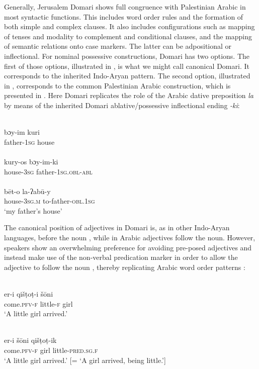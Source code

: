 \documentclass[output=paper]{langsci/langscibook}
\begin{document}
Generally, Jerusalem Domari shows full congruence with Palestinian Arabic in most syntactic functions. This includes word order rules and the formation of both simple and complex clauses. It also includes configurations such as mapping of tenses and modality to complement and conditional clauses, and the mapping of semantic relations onto case markers. The latter can be adpositional or inflectional. For nominal possessive constructions, Domari has two options. The first of those options, illustrated in , is what we might call canonical Domari. It corresponds to the inherited Indo-Aryan pattern. The second option, illustrated in , corresponds to the common Palestinian Arabic construction, which is presented in . Here Domari replicates the role of the Arabic dative preposition \textit{la} by means of the inherited Domari ablative/possessive inflectional ending \textit{-ki}:

\ea\label{ex:matras:}
\ea
{}\\
\gll bɔy-im kuri    \\
     father-\textsc{1sg} house\\ \label{kuri}
\ex
{}\\
\gll kury-os bɔy-im-ki  \\
       house-\textsc{3sg} father-\textsc{1sg.obl-abl}\\ \label{boy}
\ex
{}\\
\gll bēt-o la-ʔabū-y  \\
       house-\textsc{3sg.m} to-father-\textsc{obl.1sg}\\
\glt   ‘my father’s house’ \label{bett}
\z
\z

The canonical position of adjectives in Domari is, as in other Indo-Aryan languages, before the noun , while in Arabic adjectives follow the noun. However, speakers show an overwhelming preference for avoiding pre-posed adjectives and instead make use of the non-verbal predication marker in order to allow the adjective to follow the noun , thereby replicating Arabic word order patterns :

\ea\label{girls}
\ea
{}\\
\gll er-i qišṭoṭ-i šōni  \\
       come.\textsc{pfv-f} little-\textsc{f} girl\\
\glt   ‘A little girl arrived.’ \label{girla}

\ex\label{ex:matras:}
\\
\gll   er-i šōni qišṭoṭ-ik  \\
       come.\textsc{pfv-f} girl little-\textsc{pred.sg.f}\\
\glt   ‘A little girl arrived.’ [= ‘A girl arrived, being little.’] \label{girlb}
\end{document}
